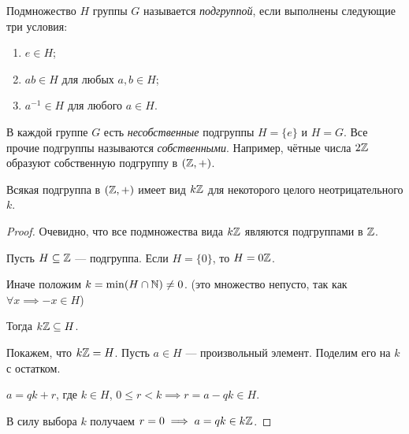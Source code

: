 \begin{definition}
    Подмножество $H$ группы $G$ называется \textit{подгруппой}, если выполнены следующие три условия:
    \begin{enumerate}[nosep]
    \item $e \in H$;
    \item $ab \in H$ для любых $a, b \in H$;
    \item $a^{-1} \in H$ для любого $a \in H$.
    \end{enumerate}
\end{definition}

В каждой группе $G$ есть \textit{несобственные} подгруппы $H = \{e\}$ и $H = G$. Все прочие подгруппы называются \textit{собственными}. Например, чётные числа $2\mathbb{Z}$ образуют собственную подгруппу в $(\mathbb{Z}, +)$.

\begin{proposal}
    Всякая подгруппа в $(\mathbb{Z}, +)$ имеет вид $k\mathbb{Z}$ для некоторого целого неотрицательного $k$.
\end{proposal}

\begin{proof}
    Очевидно, что все подмножества вида $k\mathbb{Z}$ являются подгруппами в $\mathbb{Z}$.

    Пусть $H \subseteq \mathbb{Z}$ --- подгруппа. Если $H = \{0\}$, то $H = 0\mathbb{Z}$.
    
    Иначе положим $k = \min(H \cap \mathbb{N}) \neq 0$. (это множество непусто, так как $\forall x \implies -x \in H$)

    Тогда $k\mathbb{Z} \subseteq H$.

    Покажем, что $k\mathbb{Z} = H$. Пусть $a \in H$ --- произвольный элемент. Поделим его на $k$ с остатком.

    $a = qk + r$, где $k \in H$, $0 \leq r < k \implies r = a - qk \in H$.

    В силу выбора $k$ получаем $r = 0 \implies a = qk \in k \mathbb{Z}$.
\end{proof}
